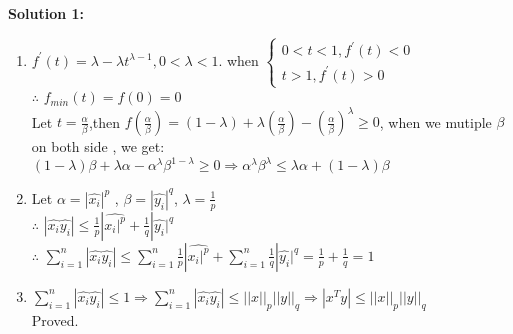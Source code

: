 \documentclass[english,onecolumn,UTF8]{IEEEtran}
\begin{document}
\textbf{Solution 1:}
\begin{enumerate}
	\item
		$f^{'}(t)=\lambda - \lambda t^{\lambda-1}, 0<\lambda<1$.
		when $\left \{ 
		\begin{array}{l}
			0<t<1,f^{'}(t)<0\\
			t>1,f^{'}(t)>0
		\end{array}
		\right.$\\
		$\therefore$ $f_{min}(t)=f(0)=0$\\
		Let $t=\frac{\alpha}{\beta}$,\quad then $f(\frac{\alpha}{\beta})=(1-\lambda)+\lambda(\frac{\alpha}{\beta})-(\frac{\alpha}{\beta})^{\lambda}\geq 0$, when we mutiple $\beta$ on both side , we get:\\
		$(1-\lambda)\beta+\lambda\alpha-\alpha^{\lambda}\beta^{1-\lambda}\geq 0 \Rightarrow \alpha^{\lambda}\beta^{\lambda}\leq \lambda \alpha +(1-\lambda)\beta$ 
	\item
		Let $\alpha = |\hat{x_{i}}|^{p}$ , $\beta = |\hat{y_{i}}|^{q}$, $\lambda=\frac{1}{p}$\\
		$\therefore$ $ |\hat{x_{i}}\hat{y_{i}}|\leq\frac{1}{p}|\hat{x_{i}|^{p}}+\frac{1}{q}|\hat{y_{i}}|^{q}$\\
		$\therefore$ $ \sum_{i=1}^n|\hat{x_{i}}\hat{y_{i}}|\leq \sum_{i=1}^n\frac{1}{p}|\hat{x_{i}|^{p}}+\sum_{i=1}^n\frac{1}{q}|\hat{y_{i}}|^{q}=\frac{1}{p}+\frac{1}{q}=1$
	\item
		$\sum_{i=1}^n|\hat{x_{i}}\hat{y_{i}}|\leq 1\Rightarrow \sum_{i=1}^n|\hat{x_{i}}\hat{y_{i}}|\leq||x||_{p}||y||_{q}\Rightarrow |x^{T}y|\leq ||x||_{p}||y||_{q}$\\
		Proved.

\end{enumerate}
\end{document}
